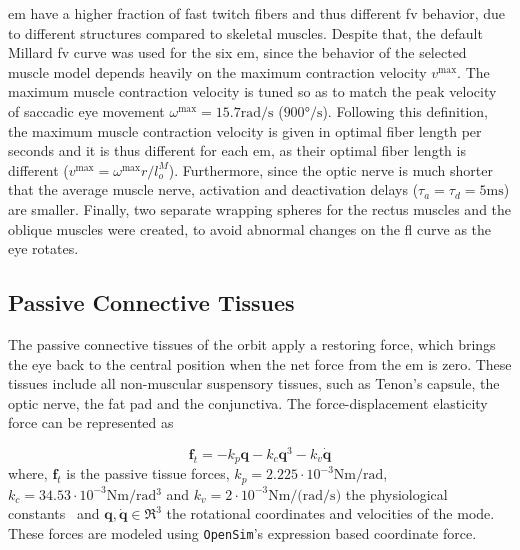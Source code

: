 \documentclass[11pt,a4paper,draft=false]{report}
\renewcommand*{\vec}[1]{\bm{#1}}
\newcommand{\R}[1]{\mathfrak{R}^{#1}}
\newcommand{\inr}[1]{\in\R{#1}}
\begin{document}
\gls{em} have a higher fraction of fast twitch fibers and thus different
\gls{fv} behavior, due to different structures compared to skeletal
muscles. Despite that, the default Millard \gls{fv} curve was used for the six
\gls{em}, since the behavior of the selected muscle model depends heavily on the
maximum contraction velocity $v^{\text{max}}$. The maximum muscle contraction
velocity is tuned so as to match the peak velocity of saccadic eye movement
$\omega^{\text{max}} = 15.7 \si{\radian / \s}$ ($900 \si{\degree /
  \s}$). Following this definition, the maximum muscle contraction velocity is
given in optimal fiber length per seconds and it is thus different for each
\gls{em}, as their optimal fiber length is different
($v^{\text{max}} = \omega^{\text{max}} r / l_o^M$). Furthermore, since the optic
nerve is much shorter that the average muscle nerve, activation and deactivation
delays ($\tau_a = \tau_d = 5 \si{\milli\s}$) are smaller. Finally, two
separate wrapping spheres for the rectus muscles and the oblique muscles were
created, to avoid abnormal changes on the \gls{fl} curve as the eye rotates.

\subsection*{Passive Connective Tissues}\label{sec:passive-connective-tissues}

The passive connective tissues of the orbit apply a restoring force, which
brings the eye back to the central position when the net force from the \gls{em}
is zero. These tissues include all non-muscular suspensory tissues, such as
Tenon's capsule, the optic nerve, the fat pad and the conjunctiva. The
force-displacement elasticity force can be represented as

\begin{equation}\label{equ:passive-tissue}
  \vec{f}_t = -k_p \vec{q} - k_c \vec{q}^3 - k_v \vec{\dot{q}}
\end{equation}
% 
where, $\vec{f}_t$ is the passive tissue forces,
$k_p= 2.225 \cdot 10^{-3} \si{\N \m / \radian}$,
$k_c= 34.53 \cdot 10^{-3} \si{\N \m / \radian^3}$ and
$k_v= 2 \cdot 10^{-3} \si{\N \m / (\radian / \s)}$ the physiological
constants~\cite{Robinson1969a, Collins1981, Priamikov2016} and
$\vec{q}, \vec{\dot{q}} \inr{3}$ the rotational coordinates and velocities of
the mode. These forces are modeled using \texttt{OpenSim}'s expression based
coordinate force.
\end{document}

